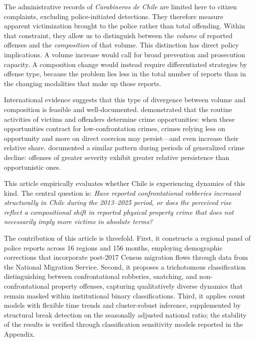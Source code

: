 \documentclass[pdflatex,sn-basic]{sn-jnl}
\begin{document}
The administrative records of \textit{Carabineros de Chile} are limited here to citizen complaints, excluding police-initiated detections. They therefore measure apparent victimization brought to the police rather than total offending. Within that constraint, they allow us to distinguish between the \emph{volume} of reported offenses and the \emph{composition} of that volume. This distinction has direct policy implications. A volume increase would call for broad prevention and prosecution capacity. A composition change would instead require differentiated strategies by offense type, because the problem lies less in the total number of reports than in the changing modalities that make up those reports.

International evidence suggests that this type of divergence between volume and composition is feasible and well-documented. \citet{cohen1979} demonstrated that the routine activities of victims and offenders determine crime opportunities: when these opportunities contract for low-confrontation crimes, crimes relying less on opportunity and more on direct coercion may persist---and even increase their relative share. \citet{blumstein1988} documented a similar pattern during periods of generalized crime decline: offenses of greater severity exhibit greater relative persistence than opportunistic ones.

This article empirically evaluates whether Chile is experiencing dynamics of this kind. The central question is: \textit{Have reported confrontational robberies increased structurally in Chile during the 2013--2025 period, or does the perceived rise reflect a compositional shift in reported physical property crime that does not necessarily imply more victims in absolute terms?}

The contribution of this article is threefold. First, it constructs a regional panel of police reports across 16 regions and 156 months, employing demographic corrections that incorporate post-2017 Census migration flows through data from the National Migration Service. Second, it proposes a trichotomous classification distinguishing between confrontational robberies, snatching, and non-confrontational property offenses, capturing qualitatively diverse dynamics that remain masked within institutional binary classifications. Third, it applies count models with flexible time trends and cluster-robust inference, supplemented by structural break detection on the seasonally adjusted national ratio; the stability of the results is verified through classification sensitivity models reported in the Appendix.
\end{document}
